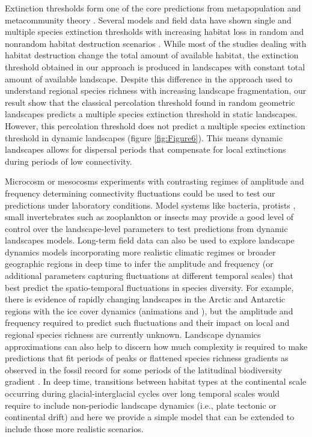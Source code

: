 \documentclass[a4paper,12pt]{article}
\begin{document}
Extinction thresholds form one of the core predictions from metapopulation and metacommunity theory \citep{tilmanetal1994, bascompte&sole1996, keymeretal2000, fahrig2002, ovaskainenhanski2003, rybickihanski2013}. Several models and field data have shown single and multiple species extinction thresholds with increasing habitat loss in random and nonrandom habitat destruction scenarios \citep{fortuna&bascompte2006}. While most of the studies dealing with habitat destruction change the total amount of available habitat, the extinction threshold obtained in our approach is produced in landscapes with constant total amount of available landscape. Despite this difference in the approach used to understand regional species richness with increasing landscape fragmentation, our result show that the classical percolation threshold found in random geometric landscapes predicts a multiple species extinction threshold in static landscapes. However, this percolation threshold does not predict a multiple species extinction threshold in dynamic landscapes (figure \ref{fig:Figure6}). This means dynamic landscapes allows for dispersal periods that compensate for local extinctions during periods of low connectivity. 

Microcosm or mesocosms experiments with contrasting regimes of amplitude and frequency determining connectivity fluctuations could be used to test our predictions under laboratory conditions. Model systems like bacteria, protists \citep{Carrara2012dendritic, AltermattEtAl2015}, small invertebrates such as zooplankton \citep{Steiner2011seasonal_experiments} or insects \citep{GovindanSwihart2012} may provide a good level of control over the landscape-level parameters to test predictions from dynamic landscapes models. Long-term field data can also be used to explore landscape dynamics models incorporating more realistic climatic regimes or broader geographic regions in deep time to infer the amplitude and frequency (or additional parameters capturing fluctuations at different temporal scales) that best predict the spatio-temporal fluctuations in species diversity. For example, there is evidence of rapidly changing landscapes in the Arctic and Antarctic regions with the ice cover dynamics (animations  and ), but the amplitude and frequency required to predict such fluctuations and their impact on local and regional species richness are currently unknown. Landscape dynamics approximations can also help to discern how much complexity is required to make predictions that fit periods of peaks or flattened species richness gradients as observed in the fossil record for some periods of the latitudinal biodiversity gradient \citep{mannionetal2014}. In deep time, transitions between habitat types at the continental scale occurring during glacial-interglacial cycles over long temporal scales would require to include non-periodic landscape dynamics (i.e., plate tectonic or continental drift) \citep{WerneckEtAl2011} and here we provide a simple model that can be extended to include those more realistic scenarios.
     
\end{document}
